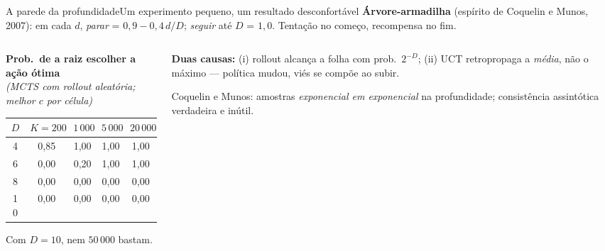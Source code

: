 \documentclass[aspectratio=169, 10pt]{beamer}
\begin{document}
\begin{frame}{A parede da profundidade}{Um experimento pequeno, um resultado desconfortável}
  \footnotesize
  \textbf{Árvore-armadilha} (espírito de Coquelin e Munos, 2007): em cada $d$, \emph{parar} = $0{,}9 - 0{,}4\,d/D$; \emph{seguir} até $D$ = $1{,}0$. Tentação no começo, recompensa no fim.
  \smallskip
  \begin{columns}[T]
    \begin{column}{0.46\textwidth}
      \centering\scriptsize
      \textbf{Prob.\ de a raiz escolher a ação ótima}\\
      \emph{(MCTS com rollout aleatória; melhor $c$ por célula)}
      \medskip
      \begin{tabular}{ccccc}
        \toprule
        $D$ & $K=200$ & $1\,000$ & $5\,000$ & $20\,000$ \\
        \midrule
        4  & 0,85 & 1,00 & 1,00 & 1,00 \\
        6  & 0,00 & 0,20 & 1,00 & 1,00 \\
        8  & 0,00 & 0,00 & \alert{0,00} & \alert{0,00} \\
        10 & 0,00 & 0,00 & \alert{0,00} & \alert{0,00} \\
        \bottomrule
      \end{tabular}
      \smallskip

      Com $D=10$, nem $50\,000$ bastam.
    \end{column}
    \begin{column}{0.52\textwidth}
      \begin{alertabox}
        \textbf{Duas causas:} (i) rollout alcança a folha com prob.\ $2^{-D}$; (ii) UCT retropropaga a \emph{média}, não o máximo — política mudou, viés se compõe ao subir.
      \end{alertabox}
      \begin{ideiabox}
        Coquelin e Munos: amostras \emph{exponencial em exponencial} na profundidade; consistência assintótica verdadeira e inútil.
      \end{ideiabox}
    \end{column}
  \end{columns}
\end{frame}
\end{document}
